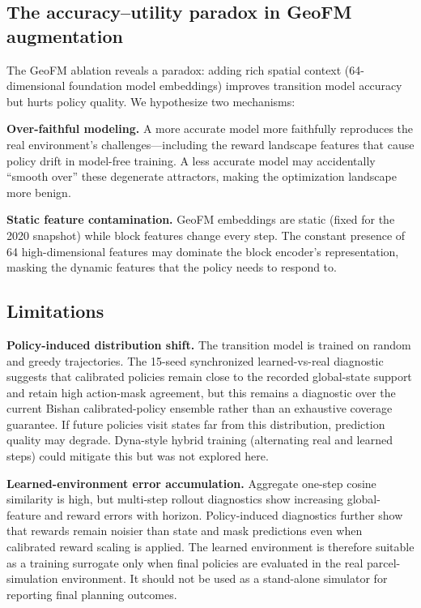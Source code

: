 \documentclass[11pt]{article}
\begin{document}
\subsection{The accuracy--utility paradox in GeoFM augmentation}

The GeoFM ablation reveals a paradox: adding rich spatial context (64-dimensional foundation model embeddings) improves transition model accuracy but hurts policy quality. We hypothesize two mechanisms:

\textbf{Over-faithful modeling.} A more accurate model more faithfully reproduces the real environment's challenges---including the reward landscape features that cause policy drift in model-free training. A less accurate model may accidentally ``smooth over'' these degenerate attractors, making the optimization landscape more benign.

\textbf{Static feature contamination.} GeoFM embeddings are static (fixed for the 2020 snapshot) while block features change every step. The constant presence of 64 high-dimensional features may dominate the block encoder's representation, masking the dynamic features that the policy needs to respond to.

\subsection{Limitations}

\textbf{Policy-induced distribution shift.} The transition model is trained on random and greedy trajectories. The 15-seed synchronized learned-vs-real diagnostic suggests that calibrated policies remain close to the recorded global-state support and retain high action-mask agreement, but this remains a diagnostic over the current Bishan calibrated-policy ensemble rather than an exhaustive coverage guarantee. If future policies visit states far from this distribution, prediction quality may degrade. Dyna-style hybrid training (alternating real and learned steps) could mitigate this but was not explored here.

\textbf{Learned-environment error accumulation.} Aggregate one-step cosine similarity is high, but multi-step rollout diagnostics show increasing global-feature and reward errors with horizon. Policy-induced diagnostics further show that rewards remain noisier than state and mask predictions even when calibrated reward scaling is applied. The learned environment is therefore suitable as a training surrogate only when final policies are evaluated in the real parcel-simulation environment. It should not be used as a stand-alone simulator for reporting final planning outcomes.
\end{document}
